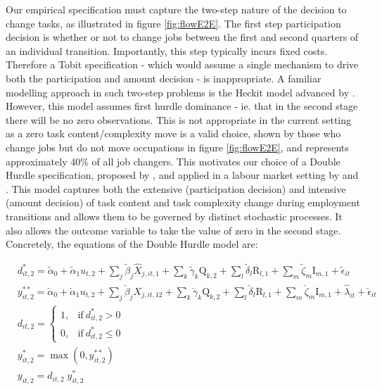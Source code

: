 \documentclass[12pt,authoryear]{elsarticle}
\begin{document}
\noindent Our empirical specification must capture the two-step nature of the decision to change tasks, as illustrated in figure \ref{fig:flowE2E}. The first step participation decision is whether or not to change jobs between the first and second quarters of an individual transition. Importantly, this step typically incurs fixed costs. Therefore a Tobit specification - which would assume a single mechanism to drive both the participation and amount decision - is inappropriate. A familiar modelling approach in such two-step problems is the Heckit model advanced by \cite{Heckman}. However, this model assumes first hurdle dominance - ie. that in the second stage there will be no zero observations. This is not appropriate in the current setting as a zero task content/complexity move is a valid choice, shown by those who change jobs but do not move occupations in figure \ref{fig:flowE2E}, and represents approximately 40\% of all job changers. This motivates our choice of a Double Hurdle specification, proposed by \cite{cragg1971}, and applied in a labour market setting by \cite{BlundellMeghir} and \cite{Blundell1989}. This model captures both the extensive (participation decision) and intensive (amount decision) of task content and task complexity change during employment transitions and allows them to be governed by distinct stochastic processes. It also allows the outcome variable to take the value of zero in the second stage.
Concretely, the equations of the Double Hurdle model are:

	\begin{subequations}
	\label{eqn:heckman}
	\begin{align}
		& d^{*}_{it,2} = \tilde{\alpha}_0 + \tilde{\alpha}_{1}u_{t,2}  + \sum_{j} \tilde{\beta}_{j}\hat{X}_{j,it,1} + \sum_{k} \tilde{\gamma}_{k} \text{Q}_{k,2} + \sum_{l} \tilde{\delta}_{l} \text{R}_{l,1} + \sum_{m} \tilde{\zeta}_{m} \text{I}_{m,1} +  \tilde{\epsilon}_{it} \label{eqn:a}\\
		& y_{it,2}^{**} = \check{\alpha}_0 + \check{\alpha}_{1}u_{t,2} + \sum_{j} \check{\beta}_{j}X_{j,it,12} + \sum_{k}\check{\gamma}_{k} \text{Q}_{k,2} + \sum_{l} \check{\delta}_{l} \text{R}_{l,1}  + \sum_{m} \check{\zeta}_{m} \text{I}_{m,1} + \hat{\lambda}_{it} + \check{\epsilon}_{it} \label{eqn:b} \\
		& d_{it,2} =
		\begin{cases}
			1, & \text{if}\  d^{*}_{it,2} >0  \\
			0, & \text{if}\ d^{*}_{it,2} \leq0  
		\end{cases}\label{eqn:c}\\
		& y_{it,2}^* =\max(0, y_{it,2}^{**})  \label{eqn:d} \\
		& y_{it,2} = d_{it,2}\; y_{it,2}^* \label{eqn:e} 
	\end{align}
\end{subequations}
\end{document}
